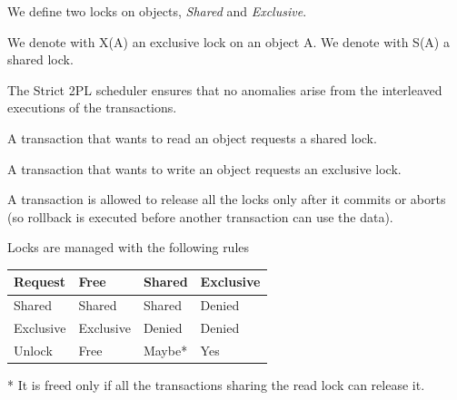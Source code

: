 \documentclass{beamer}
\begin{document}
\begin{slide}{
	\item We define two locks on objects, \textit{Shared} and \textit{Exclusive}.
	\item We denote with X(A) an exclusive lock on an object A. We denote with S(A) a shared lock.
	\item The Strict 2PL scheduler ensures that no anomalies arise from the interleaved executions of the transactions.
}\end{slide}

\begin{slide}{
	\item A transaction that wants to read an object requests a shared lock.
	\item A transaction that wants to write an object requests an exclusive lock.
	\item A transaction is allowed to release all the locks only after it commits or aborts (so rollback is executed before another transaction can use the data).
}\end{slide}

\begin{slide}{
	\item Locks are managed with the following rules
	\begin{table}
		\begin{tabular}{|l|l|l|l|}
		\hline
		\textbf{Request} & Free & Shared & Exclusive \\
		\hline
		Shared	& Shared & Shared & Denied \\
		\hline
		Exclusive & Exclusive & Denied & Denied \\
		\hline
		Unlock & Free & Maybe* & Yes \\
		\hline
		\end{tabular}
	\end{table}
	\item[*] It is freed only if all the transactions sharing the read lock can release it.
}\end{slide}
\end{document}
